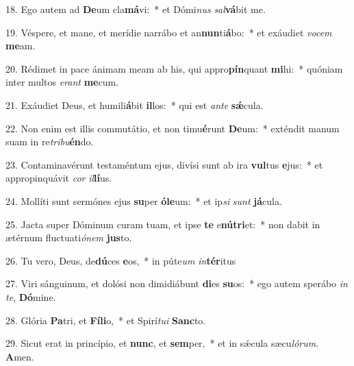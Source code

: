 18. Ego autem ad \textbf{De}um cla\textbf{má}vi:~*  et Dómi\textit{nus} \textit{sal}\textbf{vá}bit me.\

19. Véspere, et mane, et merídie narrábo et an\textbf{nun}ti\textbf{á}bo:~*  et exáudiet \textit{vo}\textit{cem} \textbf{me}am.\

20. Rédimet in pace ánimam meam ab his, qui appro\textbf{pín}quant \textbf{mi}hi:~*  quóniam inter multos \textit{e}\textit{rant} \textbf{me}cum.\

21. Exáudiet Deus, et humili\textbf{á}bit \textbf{il}los:~*  qui est \textit{an}\textit{te} \textbf{sǽ}cula.\

22. Non enim est illis commutátio, et non timu\textbf{é}runt \textbf{De}um:~*  exténdit manum suam in re\textit{tri}\textit{bu}\textbf{én}do.\

23. Contaminavérunt testaméntum ejus, divísi sunt ab ira \textbf{vul}tus \textbf{e}jus:~*  et appropinquávit \textit{cor} \textit{il}\textbf{lí}us.\

24. Mollíti sunt sermónes ejus \textbf{su}per \textbf{ó}\textbf{le}um:~*  et ip\textit{si} \textit{sunt} \textbf{já}cula.\

25. Jacta super Dóminum curam tuam, et ipse \textbf{te} e\textbf{nú}\textbf{tri}et:~*  non dabit in ætérnum fluctuati\textit{ó}\textit{nem} \textbf{jus}to.\

26. Tu vero, Deus, de\textbf{dú}ces \textbf{e}os,~*  in púte\textit{um} \textit{in}\textbf{tér}itus\

27. Viri sánguinum, et dolósi non dimidiábunt \textbf{di}es \textbf{su}os:~*  ego autem sperábo \textit{in} \textit{te}, \textbf{Dó}mine.\

28. Glória \textbf{Pa}tri, et \textbf{Fí}\textbf{li}o,~*  et Spirí\textit{tu}\textit{i} \textbf{Sanc}to.\

29. Sicut erat in princípio, et \textbf{nunc}, et \textbf{sem}per,~*  et in sǽcula sæcu\textit{ló}\textit{rum}. \textbf{A}men.\

